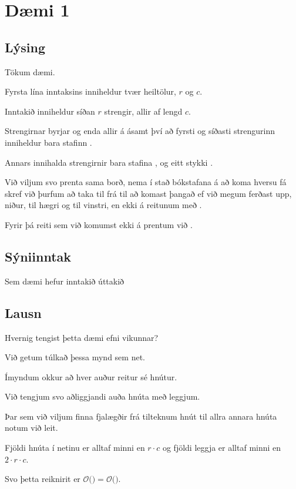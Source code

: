 \section{Dæmi 1}
\subsection{Lýsing}
{
	{
		\item<1-> Tökum dæmi.
		\item<2-> Fyrsta lína inntaksins inniheldur tvær heiltölur, $r$ og $c$.
		\item<3-> Inntakið inniheldur síðan $r$ strengir, allir af lengd $c$.
		\item<4-> Strengirnar byrjar og enda allir á  ásamt því að fyrsti og síðasti strengurinn inniheldur bara stafinn .
		\item<5-> Annars innihalda strengirnir bara stafina ,  og eitt stykki .
		\item<6->[] 
		\item<7-> Við viljum svo prenta sama borð, nema í stað bókstafana á að koma hversu fá skref við þurfum að taka til frá 
					til að komast þangað ef við megum ferðast upp, niður, til hægri og til vinstri, en ekki á reitunum með .
		\item<8-> Fyrir þá reiti sem við komumst ekki á prentum við .
	}
}

\subsection{Sýniinntak}
{
	{
		\item<1-> Sem dæmi hefur inntakið
					úttakið	
	}
}

\subsection{Lausn}
{
	{
		\item<1-> Hvernig tengist þetta dæmi efni vikunnar?
		\item<2-> Við getum túlkað þessa mynd sem net.
		\item<3-> Ímyndum okkur að hver auður reitur sé hnútur.
		\item<4-> Við tengjum svo aðliggjandi auða hnúta með leggjum.
		\item<5-> Þar sem við viljum finna fjalægðir frá tilteknum hnút til allra annara hnúta notum við leit.
		\item<7-> Fjöldi hnúta í netinu er alltaf minni en $r \cdot c$ og fjöldi leggja er alltaf minni en $2 \cdot r \cdot c$.
		\item<8-> Svo þetta reiknirit er $\mathcal{O}($$) = \mathcal{O}($\onslide<10->{$r \cdot c$}$)$.
	}
}

